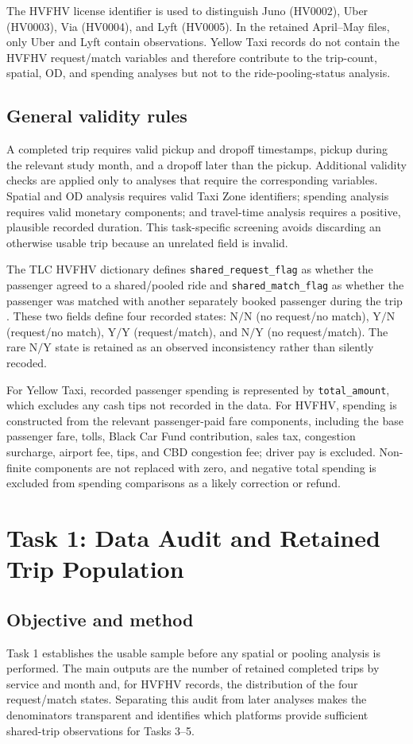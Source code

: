 \documentclass[10pt,a4paper]{article}
\newcommand{\NN}{\ensuremath{\mathrm{N/N}}}
\newcommand{\YN}{\ensuremath{\mathrm{Y/N}}}
\newcommand{\YY}{\ensuremath{\mathrm{Y/Y}}}
\newcommand{\NY}{\ensuremath{\mathrm{N/Y}}}
\begin{document}
The HVFHV license identifier is used to distinguish Juno (HV0002), Uber (HV0003), Via (HV0004), and Lyft (HV0005). In the retained April--May files, only Uber and Lyft contain observations. Yellow Taxi records do not contain the HVFHV request/match variables and therefore contribute to the trip-count, spatial, OD, and spending analyses but not to the ride-pooling-status analysis.

\subsection{General validity rules}
A completed trip requires valid pickup and dropoff timestamps, pickup during the relevant study month, and a dropoff later than the pickup. Additional validity checks are applied only to analyses that require the corresponding variables. Spatial and OD analysis requires valid Taxi Zone identifiers; spending analysis requires valid monetary components; and travel-time analysis requires a positive, plausible recorded duration. This task-specific screening avoids discarding an otherwise usable trip because an unrelated field is invalid.

The TLC HVFHV dictionary defines \texttt{shared\_request\_flag} as whether the passenger agreed to a shared/pooled ride and \texttt{shared\_match\_flag} as whether the passenger was matched with another separately booked passenger during the trip \cite{tlc_hvfhv}. These two fields define four recorded states: \NN{} (no request/no match), \YN{} (request/no match), \YY{} (request/match), and \NY{} (no request/match). The rare \NY{} state is retained as an observed inconsistency rather than silently recoded.

For Yellow Taxi, recorded passenger spending is represented by \texttt{total\_amount}, which excludes any cash tips not recorded in the data. For HVFHV, spending is constructed from the relevant passenger-paid fare components, including the base passenger fare, tolls, Black Car Fund contribution, sales tax, congestion surcharge, airport fee, tips, and CBD congestion fee; driver pay is excluded. Non-finite components are not replaced with zero, and negative total spending is excluded from spending comparisons as a likely correction or refund.

\section{Task 1: Data Audit and Retained Trip Population}
\subsection{Objective and method}
Task 1 establishes the usable sample before any spatial or pooling analysis is performed. The main outputs are the number of retained completed trips by service and month and, for HVFHV records, the distribution of the four request/match states. Separating this audit from later analyses makes the denominators transparent and identifies which platforms provide sufficient shared-trip observations for Tasks 3--5.
\end{document}
